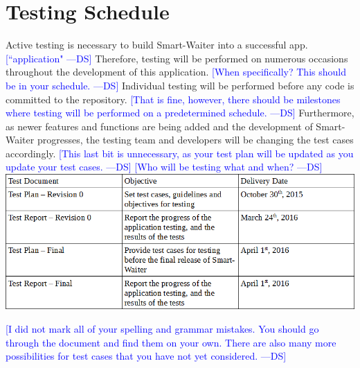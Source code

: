 \documentclass[12pt]{article}
\newcommand{\authornote}[3]{\textcolor{#1}{[#3 ---#2]}}
\newcommand{\authornote}[3]{}
\newcommand{\ds}[1]{\authornote{blue}{DS}{#1}}
\begin{document}
\section{Testing Schedule}
Active testing is necessary to build Smart-Waiter into a successful app.
\ds{``application"}
Therefore, testing will be performed on numerous occasions throughout the development of this application. 
\ds{When specifically? This should be in your schedule.}
Individual testing will be performed before any code is committed to the repository.
\ds{That is fine, however, there should be milestones where testing will be performed 
on a predetermined schedule.}
Furthermore, as newer features and functions are being added and the development of Smart-Waiter progresses, the testing team and developers will be changing the test cases accordingly. 
\ds{This last bit is unnecessary, as your test plan will be updated as you
update your test cases.}
\newline
\ds{Who will be testing what and when?}
\newline
\includegraphics[width=\textwidth,height=\textheight,keepaspectratio]{TestingSchedule.png}

\ds{I did not mark all of your spelling and grammar mistakes. You should go 
through the document and find them on your own. There are also many more possibilities
for test cases that you have not yet considered.}
\end{document}
